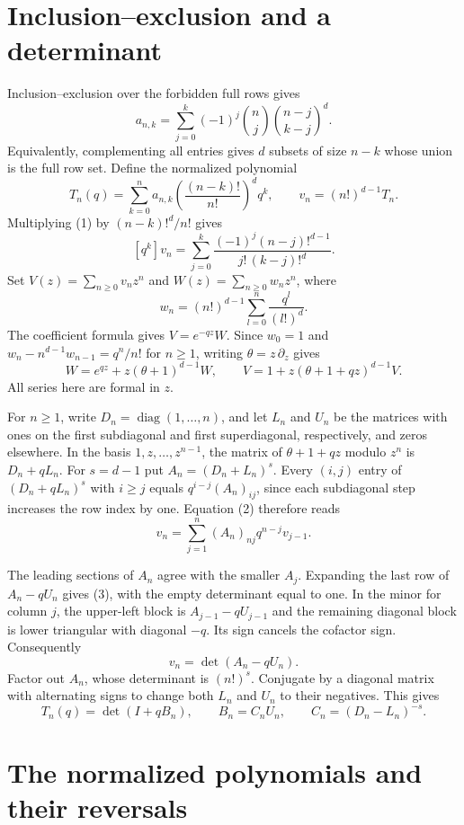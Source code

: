 \documentclass[11pt]{article}
\begin{document}
\section{Inclusion–exclusion and a determinant}

Inclusion–exclusion over the forbidden full rows gives
\[
a_{n,k}=\sum_{j=0}^k(-1)^j\binom nj\binom{n-j}{k-j}^{d}.
\tag{1}
\]
Equivalently, complementing all entries gives $d$ subsets of size $n-k$ whose union is the full row set. Define the normalized polynomial
\[
T_n(q)=\sum_{k=0}^n a_{n,k}\left(\frac{(n-k)!}{n!}\right)^d q^k
,\qquad
v_n=(n!)^{d-1}T_n.
\]
Multiplying (1) by $(n-k)!^d/n!$ gives
\[
[q^k]v_n=\sum_{j=0}^k\frac{(-1)^j(n-j)!^{d-1}}{j!\,(k-j)!^d}.
\]
Set $V(z)=\sum_{n\ge0}v_nz^n$ and $W(z)=\sum_{n\ge0}w_nz^n$, where
\[
w_n=(n!)^{d-1}\sum_{l=0}^n\frac{q^l}{(l!)^d}.
\]
The coefficient formula gives $V=e^{-qz}W$. Since $w_0=1$ and $w_n-n^{d-1}w_{n-1}=q^n/n!$ for $n\ge1$, writing $\theta=z\,\partial_z$ gives
\[
W=e^{qz}+z(\theta+1)^{d-1}W,\qquad
V=1+z(\theta+1+qz)^{d-1}V .
\tag{2}
\]
All series here are formal in $z$.

For $n\ge1$, write $D_n=\operatorname{diag}(1,\ldots,n)$, and let $L_n$ and $U_n$ be the matrices with ones on the first subdiagonal and first superdiagonal, respectively, and zeros elsewhere. In the basis $1,z,\ldots,z^{n-1}$, the matrix of $\theta+1+qz$ modulo $z^n$ is $D_n+qL_n$. For $s=d-1$ put $A_n=(D_n+L_n)^s$. Every $(i,j)$ entry of $(D_n+qL_n)^s$ with $i\ge j$ equals $q^{i-j}(A_n)_{ij}$, since each subdiagonal step increases the row index by one. Equation (2) therefore reads
\[
v_n=\sum_{j=1}^n (A_n)_{nj}q^{n-j}v_{j-1}.
\tag{3}
\]

The leading sections of $A_n$ agree with the smaller $A_j$. Expanding the last row of $A_n-qU_n$ gives (3), with the empty determinant equal to one. In the minor for column $j$, the upper-left block is $A_{j-1}-qU_{j-1}$ and the remaining diagonal block is lower triangular with diagonal $-q$. Its sign cancels the cofactor sign. Consequently
\[
v_n=\det(A_n-qU_n).
\]
Factor out $A_n$, whose determinant is $(n!)^s$. Conjugate by a diagonal matrix with alternating signs to change both $L_n$ and $U_n$ to their negatives. This gives
\[
T_n(q)=\det(I+q B_n),\qquad
B_n=C_n U_n,\qquad C_n=(D_n-L_n)^{-s}.
\tag{4}
\]

\section{The normalized polynomials and their reversals}
\end{document}
